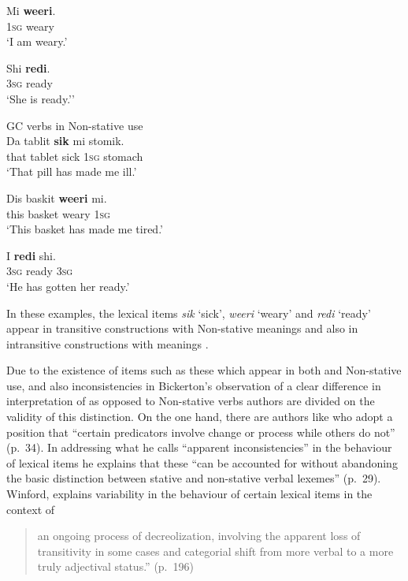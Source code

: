 \ex
\gll Mi \textbf{weeri}.\\
\textsc{1sg} weary\\
\glt `I am weary.'

\ex
\gll Shi \textbf{redi}.\\
\textsc{3sg} ready\\
\glt `She is ready.'' \z \z

\ea%
\label{ex:3:16}
GC  verbs in Non-stative use \\\citep[31]{Jaganauth1987}
\ea
\gll Da tablit \textbf{sik} mi stomik.\\
	that tablet sick \textsc{1sg} stomach        \\
\glt `That pill has made me ill.'

\ex
\gll Dis baskit \textbf{weeri} mi.\\
     this basket weary \textsc{1sg}       \\
\glt `This basket has made me tired.'

\ex
\gll I \textbf{redi} shi.\\
\textsc{3sg} ready \textsc{3sg}\\
\glt `He has gotten her ready.' \z \z

In these examples, the lexical items \textit{sik} `sick',
\textit{weeri} `weary' and \textit{redi} `ready' appear in transitive
constructions with Non-stative meanings  and also in
intransitive constructions with  meanings .

Due to the existence of items such as these which appear in both
 and Non-stative use, and also inconsistencies in Bickerton’s
observation of a clear difference in  interpretation of 
as opposed to Non-stative verbs authors are divided on the validity
of this distinction.  On the one hand, there are authors like
\citet{Winford1993} who adopt a position that ``certain predicators
involve change or process while others do not” (p.~34). In addressing
what he calls ``apparent inconsistencies” in the behaviour of lexical
items he explains that these ``can be accounted for without abandoning
the basic distinction between stative and non-stative verbal lexemes”
(p.~29).  Winford, explains variability in the behaviour of certain
lexical items in the context of

\begin{quote}
an ongoing process of decreolization, involving the apparent loss of
transitivity in some cases and categorial shift from more verbal to a
more truly adjectival status.” (p.~196)
\end{quote}

